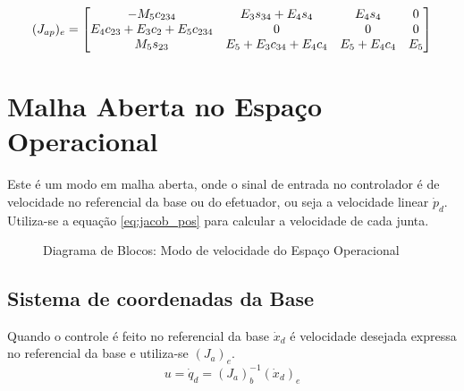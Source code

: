\begin{equation}
({J}_{ap})_e =  
\begin{bmatrix}
    -M_5c_{234} & E_3s_{34}+E_4s_4 & E_4s_4 & 0 \\
    E_4c_{23}+E_3c_2+E_5c_{234} & 0 & 0 & 0 \\
    M_5s_{23} &  E_5+E_3c_{34}+E_4c_4 & E_5+E_4c_4 & E_5 
\end{bmatrix}
\end{equation}




\section{Malha Aberta no Espaço Operacional} 
Este é um modo em malha aberta, onde o sinal de entrada no controlador é de velocidade no referencial da base ou do efetuador, ou seja a velocidade linear ${\dot{p}}_d$. Utiliza-se a equação \eqref{eq:jacob_pos} para calcular a velocidade de cada junta. 

\begin{figure}[h!]
\centering
{}
\caption{Diagrama de Blocos: Modo de velocidade do Espaço Operacional}
\label{fig:vel_op}
\end{figure}


\subsection{Sistema de coordenadas da Base} \label{sec:openloopbase}
Quando o controle é feito no referencial da base ${\dot{x}}_d$ é velocidade desejada expressa no referencial da base e utiliza-se $({J}_{a})_e$.
\begin{equation}
{u} = {\dot{q}}_d = ({J}_{a})_b^{-1} ({\dot{x}}_d)_e
\end{equation}
